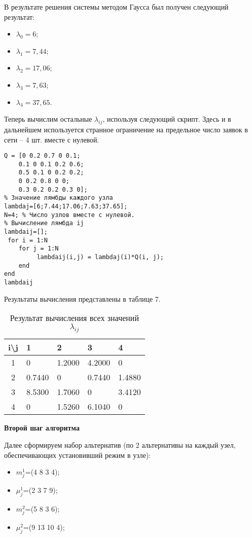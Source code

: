 В результате решения системы методом Гаусса был получен следующий результат:
\begin{itemize}
\item $\lambda_0 = 6 $;
\item $\lambda_1 = 7,44 $;
\item $\lambda_2 = 17,06 $;
\item $\lambda_3 = 7,63 $;
\item $\lambda_4 = 37,65 $.
\end{itemize}

Теперь вычислим остальные $\lambda_{ij}$, используя следующий скрипт. Здесь и в дальнейшем используется странное ограничение на предельное число заявок в сети -- 4 шт. вместе с нулевой.

\begin{Verbatim}[frame=single]
% Исходные данные
Q = [0 0.2 0.7 0 0.1;
    0.1 0 0.1 0.2 0.6;
    0.5 0.1 0 0.2 0.2;
    0 0.2 0.8 0 0;
    0.3 0.2 0.2 0.3 0];
% Значение лямбды каждого узла
lambdaj=[6;7.44;17.06;7.63;37.65];
N=4; % Число узлов вместе с нулевой.
% Вычисление лямбда ij
lambdaij=[];
 for i = 1:N
    for j = 1:N
         lambdaij(i,j) = lambdaj(i)*Q(i, j);
    end
end
lambdaij
\end{Verbatim}

Результаты вычисления представлены в таблице 7.

\begin{table}[htb]
	\begin{tabularx}{\textwidth}{|c|X|X|X|X|}
	\hline 
	i\textbackslash{}j & 1 & 2 & 3 & 4 \\ 
	\hline 
	1 &  0 & 1.2000 & 4.2000 & 0 \\ 
	\hline 
	2 & 0.7440 & 0 & 0.7440 & 1.4880 \\ 
	\hline
	3 & 8.5300 & 1.7060 & 0 & 3.4120 \\ 
	\hline 
	4 & 0 & 1.5260 & 6.1040 & 0 \\ 
	\hline 
	\end{tabularx}
\caption{Результат вычисления всех значений $\lambda_{ij}$}
\end{table}

\textbf{Второй шаг алгоритма}

Далее сформируем набор альтернатив (по 2 альтернативы на каждый узел, обеспечивающих установивший режим в узле):
\begin{itemize}
\item $m_j^1$=(4 8 3 4);
\item $\mu_j^1$=(2 3 7 9);
\item $m_j^2$=(5 8 3 6);
\item $\mu_j^2$=(9 13 10 4);
\end{itemize}

